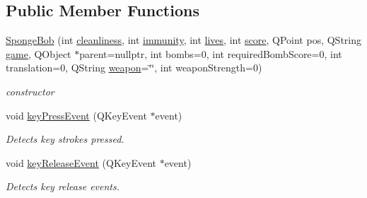 \subsection*{Public Member Functions}
\begin{DoxyCompactItemize}
\item 
\hyperlink{classSpongeBob_acd6c5412c662a93f4f91d8888cfef804}{Sponge\-Bob} (int \hyperlink{classSpongeBob_a09c3ee16b44a4a89a014f6055868a9e5}{cleanliness}, int \hyperlink{classSpongeBob_a72a16aa8925690a274e869c0eb0a9fd5}{immunity}, int \hyperlink{classSpongeBob_a801b813e51511cb779f077e6b510eb56}{lives}, int \hyperlink{classSpongeBob_a24b14e1237cb158488cb1bcf84b42d13}{score}, Q\-Point pos, Q\-String \hyperlink{classSpongeBob_a271879173f8458be51a074e89e694403}{game}, Q\-Object $\ast$parent=nullptr, int bombs=0, int required\-Bomb\-Score=0, int translation=0, Q\-String \hyperlink{classSpongeBob_a264d204946dc5aea60f5f2126fc546d3}{weapon}=\char`\"{}\char`\"{}, int weapon\-Strength=0)
\begin{DoxyCompactList}\small\item\em constructor \end{DoxyCompactList}\item 
void \hyperlink{classSpongeBob_a489d205da14cfc2760cba9624eb03772}{key\-Press\-Event} (Q\-Key\-Event $\ast$event)
\begin{DoxyCompactList}\small\item\em Detects key strokes pressed. \end{DoxyCompactList}\item 
void \hyperlink{classSpongeBob_a8e01b8481b4b5af4072ab6973cbf761f}{key\-Release\-Event} (Q\-Key\-Event $\ast$event)
\begin{DoxyCompactList}\small\item\em Detects key release events. \end{DoxyCompactList}\end{DoxyCompactItemize}
